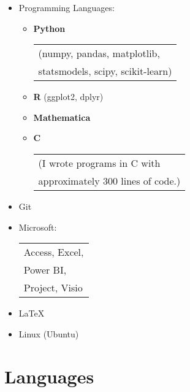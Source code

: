 \documentclass[12pt]{article}
\newcommand{\thesectionicon}{}
\newcommand{\sectionicon}[1]{\renewcommand{\thesectionicon}{#1}}
\begin{document}
\begin{minipage}[t]{0.6\textwidth}
\begin{itemize}
  \setlength{\itemsep}{0pt}
  \item Programming Languages:
  \begin{itemize}
    \setlength{\itemsep}{0pt}
  \item \textbf{Python}
      \begin{tabular}[t]{l}
          (numpy, pandas, matplotlib, \\
           statsmodels, scipy, scikit-learn)\\
    \end{tabular}
    \item \textbf{R} (ggplot2, dplyr)
    \item \textbf{Mathematica}
    \item \textbf{C}
      \begin{tabular}[t]{l}
          (I wrote programs in C with\\
          approximately 300 lines of code.)\\
    \end{tabular}
  \end{itemize}
\end{itemize}
\end{minipage}
\begin{minipage}[t]{0.35\textwidth}
\begin{itemize}
  \setlength{\itemsep}{0pt}
  \item Git
  \item Microsoft:\\
    \begin{tabular}[t]{l}
      Access, Excel, \\
      Power BI,\\
      Project, Visio \\
    \end{tabular}
  \item \LaTeX
  \item Linux (Ubuntu)
\end{itemize}
\hfill
\end{minipage}

\sectionicon{\faLanguage}
\section{Languages}
\end{document}
